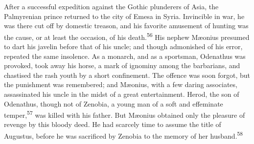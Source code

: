After a successful expedition against the Gothic plunderers of
Asia, the Palmyrenian prince returned to the city of Emesa in
Syria. Invincible in war, he was there cut off by domestic
treason, and his favorite amusement of hunting was the cause, or
at least the occasion, of his death.\textsuperscript{56} His nephew Mæonius
presumed to dart his javelin before that of his uncle; and though
admonished of his error, repeated the same insolence. As a
monarch, and as a sportsman, Odenathus was provoked, took away
his horse, a mark of ignominy among the barbarians, and chastised
the rash youth by a short confinement. The offence was soon
forgot, but the punishment was remembered; and Mæonius, with a
few daring associates, assassinated his uncle in the midst of a
great entertainment. Herod, the son of Odenathus, though not of
Zenobia, a young man of a soft and effeminate temper,\textsuperscript{57} was
killed with his father. But Mæonius obtained only the pleasure of
revenge by this bloody deed. He had scarcely time to assume the
title of Augustus, before he was sacrificed by Zenobia to the
memory of her husband.\textsuperscript{58}




